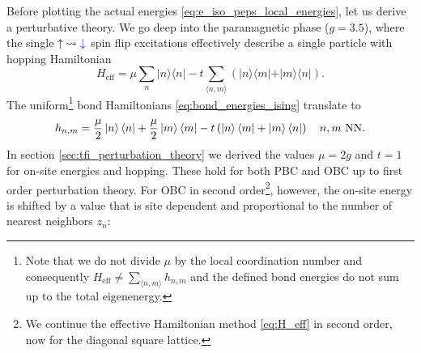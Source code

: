 \noindent Before plotting the actual energies \eqref{eq:e_iso_peps_local_energies}, let us derive a perturbative theory. We go deep into the paramagnetic phase ($g = 3.5$), where the single $\uparrow \: \leadsto \textcolor{blue}{\downarrow}$ spin flip excitations effectively describe a single particle with hopping Hamiltonian
 \begin{equation} \label{eq:H_ff}
 	H_{\text{eff}} =  
	\mu \sum_n \vert n \rangle \langle n \vert 
	- t \sum_{\langle n, m \rangle} \left( \vert n \rangle \langle m \vert + \vert m \rangle \langle n \vert \right).
 \end{equation}
The uniform\footnote{Note that we do not divide $\mu$ by the local coordination number and consequently $H_{\text{eff}} \neq \sum_{\langle n, m \rangle} h_{n,m}$ and the defined bond energies do not sum up to the total eigenenergy.} bond Hamiltonians \eqref{eq:bond_energies_ising} translate to
 \begin{equation} \label{eq:bond_hamiltonians}
	h_{n, m} =  \frac{\mu}{2} \ket{n} \bra{n} + \frac{\mu}{2} \ket{m} \bra{m} - t \left( \ket{n} \bra{m} + \ket{m} \bra{n} \right) \hspace{1em} n, m \text{ NN}.
\end{equation}
In section \ref{sec:tfi_perturbation_theory} we derived the values $\mu = 2g$ and $t = 1$ for on-site energies and hopping. These hold for both PBC and OBC up to first order perturbation theory. For OBC in second order\footnote{We continue the effective Hamiltonian method \eqref{eq:H_eff} in second order, now for the diagonal square lattice.}, however, the on-site energy is shifted by a value that is site dependent and proportional to the number of nearest neighbors $z_n$:

